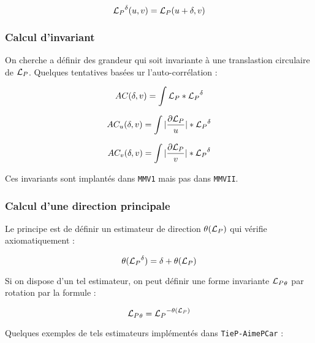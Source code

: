 \begin{equation}
    {\mathcal L_P}^\delta(u,v) = {\mathcal L_P}(u+\delta,v)
\end{equation}


\subsubsection{Calcul d'invariant}

On cherche a d\'efinir des grandeur qui soit invariante \`a une translastion
circulaire de ${\mathcal L_P}$. Quelques tentatives bas\'ees ur l'auto-corr\'elation  :

\begin{equation}
    AC(\delta,v) =  \int {\mathcal L_P} * {\mathcal L_P}^\delta
\end{equation}

\begin{equation}
    AC_u(\delta,v) =  \int |\frac{\partial {\mathcal L_P}}{u}| * {\mathcal L_P}^\delta
\end{equation}

\begin{equation}
    AC_v(\delta,v) =  \int |\frac{\partial {\mathcal L_P}}{v}| * {\mathcal L_P}^\delta
\end{equation}

Ces invariants sont implant\'es dans {\tt MMV1} mais pas dans {\tt MMVII}.


\subsubsection{Calcul d'une direction principale}

Le principe est de d\'efinir un estimateur de direction $\theta({\mathcal L_P})$ qui v\'erifie
axiomatiquement :

\begin{equation}
     \theta ({\mathcal L_P}^\delta) = \delta + \theta ({\mathcal L_P})
\end{equation}

Si on dispose d'un tel estimateur, on peut d\'efinir une forme invariante ${\mathcal L_P}_\theta$ par rotation
par la formule :


\begin{equation}
     {\mathcal L_P}_\theta = {\mathcal L_P}^{-\theta({\mathcal L_P})}
\end{equation}

Quelques exemples de tels estimateurs impl\'ement\'es dans  {\tt TieP-AimePCar} :

